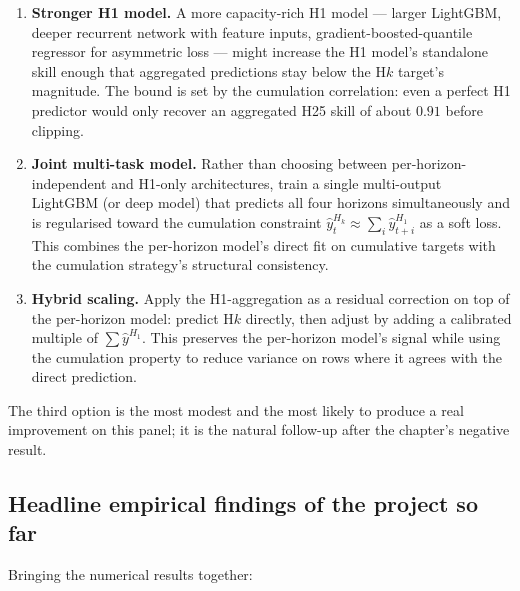 \begin{enumerate}
  \item \textbf{Stronger H1 model.} A more capacity-rich H1 model --- larger LightGBM, deeper recurrent network with feature inputs, gradient-boosted-quantile regressor for asymmetric loss --- might increase the H1 model's standalone skill enough that aggregated predictions stay below the H$k$ target's magnitude. The bound is set by the cumulation correlation: even a perfect H1 predictor would only recover an aggregated H25 skill of about $0.91$ before clipping.
  \item \textbf{Joint multi-task model.} Rather than choosing between per-horizon-independent and H1-only architectures, train a single multi-output LightGBM (or deep model) that predicts all four horizons simultaneously and is regularised toward the cumulation constraint $\hat y^{H_k}_t \approx \sum_i \hat y^{H_1}_{t+i}$ as a soft loss. This combines the per-horizon model's direct fit on cumulative targets with the cumulation strategy's structural consistency.
  \item \textbf{Hybrid scaling.} Apply the H1-aggregation as a residual correction on top of the per-horizon model: predict H$k$ directly, then adjust by adding a calibrated multiple of $\sum \hat y^{H_1}$. This preserves the per-horizon model's signal while using the cumulation property to reduce variance on rows where it agrees with the direct prediction.
\end{enumerate}

The third option is the most modest and the most likely to produce a real improvement on this panel; it is the natural follow-up after the chapter's negative result.

\subsection{Headline empirical findings of the project so far}
\label{sec:analysis:headline}

Bringing the numerical results together:

